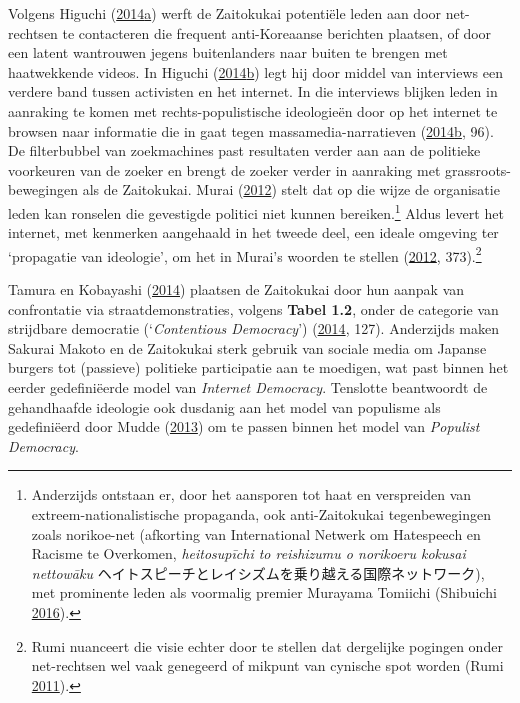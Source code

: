 \documentclass[10.5pt,dutch,]{article}
\begin{document}
Volgens Higuchi
(\protect\hyperlink{ref-higuchiux5fjapansux5f2014}{2014}\protect\hyperlink{ref-higuchiux5fjapansux5f2014}{a})
werft de Zaitokukai potentiële leden aan door net-rechtsen te
contacteren die frequent anti-Koreaanse berichten plaatsen, of door een
latent wantrouwen jegens buitenlanders naar buiten te brengen met
haatwekkende videos. In Higuchi
(\protect\hyperlink{ref-higuchiux5fned:ux5f2014}{2014}\protect\hyperlink{ref-higuchiux5fned:ux5f2014}{b})
legt hij door middel van interviews een verdere band tussen activisten
en het internet. In die interviews blijken leden in aanraking te komen
met rechts-populistische ideologieën door op het internet te browsen
naar informatie die in gaat tegen massamedia-narratieven
(\protect\hyperlink{ref-higuchiux5fned:ux5f2014}{2014}\protect\hyperlink{ref-higuchiux5fned:ux5f2014}{b},
96). De filterbubbel van zoekmachines past resultaten verder aan aan de
politieke voorkeuren van de zoeker en brengt de zoeker verder in
aanraking met grassroots-bewegingen als de Zaitokukai. Murai
(\protect\hyperlink{ref-muraiux5fnetux5f2012}{2012}) stelt dat op die
wijze de organisatie leden kan ronselen die gevestigde politici niet
kunnen bereiken.\footnote{Anderzijds ontstaan er, door het aansporen tot
  haat en verspreiden van extreem-nationalistische propaganda, ook
  anti-Zaitokukai tegenbewegingen zoals norikoe-net (afkorting van
  International Netwerk om Hatespeech en Racisme te Overkomen,
  \emph{heitosupīchi to reishizumu o norikoeru kokusai nettowāku}
  ヘイトスピーチとレイシズムを乗り越える国際ネットワーク), met
  prominente leden als voormalig premier Murayama Tomiichi (Shibuichi
  \protect\hyperlink{ref-shibuichiux5fstruggleux5f2016}{2016}).} Aldus levert het internet, met kenmerken aangehaald in het tweede deel,
een ideale omgeving ter `propagatie van ideologie', om het in Murai's
woorden te stellen (\protect\hyperlink{ref-muraiux5fnetux5f2012}{2012},
373).\footnote{Rumi nuanceert die visie echter door te stellen dat
  dergelijke pogingen onder net-rechtsen wel vaak genegeerd of mikpunt
  van cynische spot worden (Rumi
  \protect\hyperlink{ref-rumiux5fkoreansux5f2011}{2011}).}

Tamura en Kobayashi
(\protect\hyperlink{ref-tamuraux5fnigglingux5f2014}{2014}) plaatsen de
Zaitokukai door hun aanpak van confrontatie via straatdemonstraties,
volgens \textbf{Tabel 1.2}, onder de categorie van strijdbare democratie
(`\emph{Contentious Democracy}')
(\protect\hyperlink{ref-tamuraux5fnigglingux5f2014}{2014}, 127).
Anderzijds maken Sakurai Makoto en de Zaitokukai sterk gebruik van
sociale media om Japanse burgers tot (passieve) politieke participatie
aan te moedigen, wat past binnen het eerder gedefiniëerde model van
\emph{Internet Democracy}. Tenslotte beantwoordt de gehandhaafde
ideologie ook dusdanig aan het model van populisme als gedefiniëerd door
Mudde (\protect\hyperlink{ref-muddeux5foxfordux5f2013}{2013}) om te
passen binnen het model van \emph{Populist Democracy}.
\end{document}

